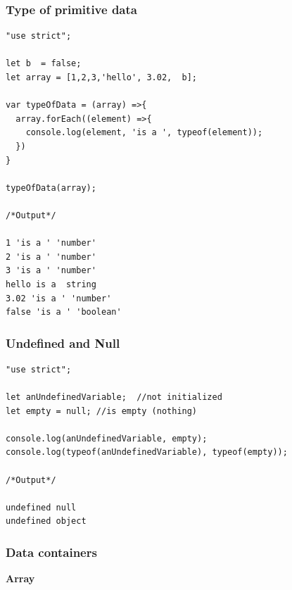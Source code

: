 \documentclass[10pt, a4paper, twocolumn]{article}
\begin{document}
\subsubsection{Type of primitive data}

\begin{lstlisting}
"use strict";

let b  = false;
let array = [1,2,3,'hello', 3.02,  b];

var typeOfData = (array) =>{
  array.forEach((element) =>{
    console.log(element, 'is a ', typeof(element));
  })
}

typeOfData(array);

/*Output*/

1 'is a ' 'number'
2 'is a ' 'number'
3 'is a ' 'number'
hello is a  string
3.02 'is a ' 'number'
false 'is a ' 'boolean'

\end{lstlisting}

\subsubsection{Undefined and Null}

\begin{lstlisting}
"use strict";

let anUndefinedVariable;  //not initialized
let empty = null; //is empty (nothing)

console.log(anUndefinedVariable, empty);
console.log(typeof(anUndefinedVariable), typeof(empty));

/*Output*/

undefined null
undefined object

\end{lstlisting}

\subsubsection{Data containers}


\textbf{Array}
\end{document}
